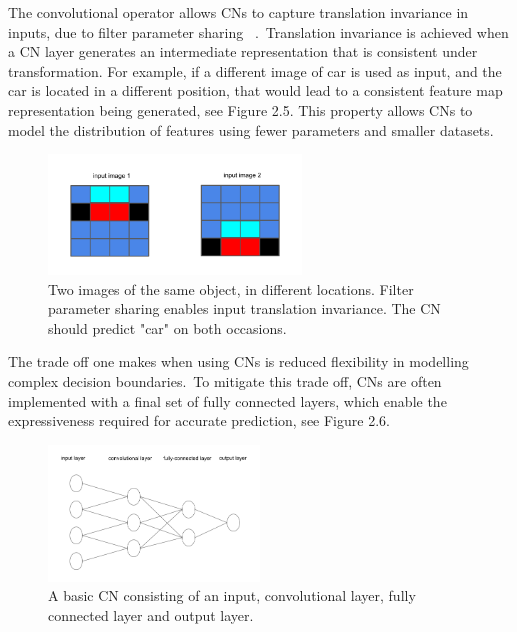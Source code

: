 \noindent The convolutional operator allows CNs to capture translation invariance in inputs, due to filter parameter sharing \unskip ~\citep{simonyan2014very}.\ Translation invariance is achieved when a CN layer generates an intermediate representation that is consistent under transformation. For example, if a different image of  car is used as input, and the car is located in a different position, that would lead to a consistent feature map representation being generated, see Figure 2.5. This property allows CNs to model the distribution of features using fewer parameters and smaller datasets. \par 

\begin{figure}[H]
   	\centering
    	\includegraphics[width=0.6\textwidth, height=0.3\textwidth]{translation_invariance}
	\caption{Two images of the same object, in different locations. Filter parameter sharing enables input translation invariance. The CN should predict "car" on both occasions.}
\end{figure}

\noindent The trade off one makes when using CNs is reduced flexibility in modelling complex decision boundaries.\ To mitigate this trade off, CNs are often implemented with a final set of fully connected layers, which enable the expressiveness required for accurate prediction, see Figure 2.6. \par

\begin{figure}[H]
   	\centering
    	\includegraphics[width=0.5\textwidth, height=0.3\textwidth]{convolutional_network}
	\caption{A basic CN consisting of an input, convolutional layer, fully connected layer and output layer.}
\end{figure}

